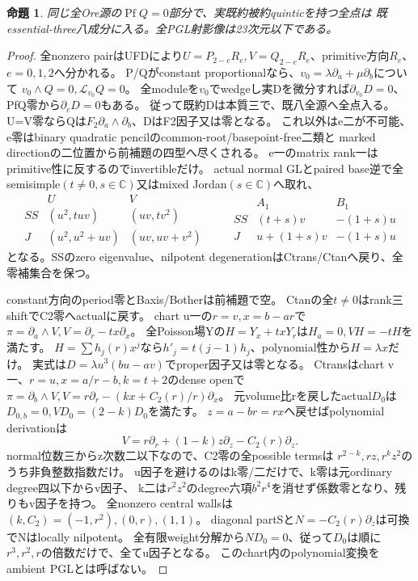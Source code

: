 \documentclass[a4paper,11pt]{ltjsarticle}
\newtheorem{proposition}{命題}[section]
\theoremstyle{definition}
\begin{document}
\begin{proposition}\label{prop:plane-concurrent-m3-zero-quartic-E}
同じ全Ore源の$\operatorname{Pf}Q=0$部分で、実既約被約quinticを持つ全点は
既essential-three八成分に入る。全PGL射影像は23次元以下である。
\end{proposition}
\begin{proof}
全nonzero pairはUFDにより$U=P_{2-e}R_e,V=Q_{2-e}R_e$、primitive方向$R_e$、$e=0,1,2$へ分かれる。
P/Qがconstant proportionalなら、$v_0=\lambda\partial_a+\mu\partial_b$について
$v_0\wedge Q=0,\mathcal L_{v_0}Q=0$。
全moduleを$v_0$でwedgeし実Dを微分すれば$\partial_{v_0}D=0$、PfQ零から$\partial_cD=0$もある。
従って既約Dは本質三で、既八全源へ全点入る。
U=V零ならQは$F_2\partial_a\wedge\partial_b$、DはF2因子又は零となる。
これ以外はe二が不可能、e零はbinary quadratic pencilのcommon-root/basepoint-free二類と
marked directionの二位置から前補題の四型へ尽くされる。
e一のmatrix rank一はprimitive性に反するのでinvertibleだけ。
actual normal GLとpaired base逆で全semisimple$(t\ne0,s\in\mathbb C)$又はmixed Jordan$(s\in\mathbb C)$へ取れ、
\[
\begin{array}{c|c|c}
 &U&V\\\hline
 SS&(u^2,tuv)&(uv,tv^2)\\
 J&(u^2,u^2+uv)&(uv,uv+v^2)
\end{array}
\qquad
\begin{array}{c|c|c}
 &A_1&B_1\\\hline
 SS&(t+s)v&-(1+s)u\\
 J&u+(1+s)v&-(1+s)u
\end{array}
\]
となる。SSのzero eigenvalue、nilpotent degenerationはCtrans/Ctanへ戻り、全零補集合を保つ。

constant方向のperiod零とBaxis/Botherは前補題で空。
Ctanの全$t\ne0$はrank三shiftでC2零へactualに戻す。
chart u一の$r=v,x=b-ar$で$\pi=\partial_a\wedge V,V=\partial_r-tx\partial_x$。
全Poisson場Yの$H=Y_x+txY_r$は$H_a=0,VH=-tH$を満たす。
$H=\sum h_j(r)x^j$なら$h'_j=t(j-1)h_j$、polynomial性から$H=\lambda x$だけ。
実式は$D=\lambda u^3(bu-av)$でproper因子又は零となる。
Ctransはchart v一、$r=u,x=a/r-b,k=t+2$のdense openで
$\pi=\partial_b\wedge V,V=r\partial_r-(kx+C_2(r)/r)\partial_x$。
元volume比rを戻したactual$D_0$は$D_{0,b}=0,VD_0=(2-k)D_0$を満たす。
$z=a-br=rx$へ戻せばpolynomial derivationは
\[
 V=r\partial_r+(1-k)z\partial_z-C_2(r)\partial_z.
\]
normal位数三からz次数二以下なので、C2零の全possible termsは
$r^{2-k},rz,r^kz^2$のうち非負整数指数だけ。
u因子を避けるのはk零/二だけで、k零は元ordinary degree四以下からv因子、
k二は$r^2z^2$のdegree六項$b^2r^4$を消せず係数零となり、残りもv因子を持つ。
全nonzero central wallsは$(k,C_2)=(-1,r^2),(0,r),(1,1)$。
diagonal partSと$N=-C_2(r)\partial_z$は可換でNはlocally nilpotent。
全有限weight分解から$ND_0=0$、従って$D_0$は順に$r^3,r^2,r$の倍数だけで、全てu因子となる。
このchart内のpolynomial変換をambient PGLとは呼ばない。


\end{proof}
\end{document}
